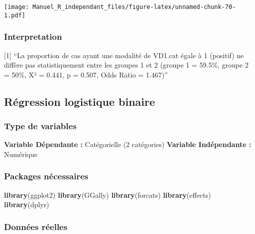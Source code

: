 \documentclass[
]{book}
\newenvironment{Shaded}{\begin{snugshade}}{\end{snugshade}}
\newcommand{\KeywordTok}[1]{\textcolor[rgb]{0.13,0.29,0.53}{\textbf{#1}}}
\newcommand{\NormalTok}[1]{#1}
\begin{document}
\texttt{[image: Manuel\_R\_independant\_files/figure-latex/unnamed-chunk-70-1.pdf]}

\hypertarget{interpretation-7}{%
\subsubsection{Interpretation}\label{interpretation-7}}

{[}1{]} ``La proportion de cas ayant une modalité de VD1.cat égale à 1 (positif) ne diffère pas statistiquement entre les groupes 1 et 2 (groupe 1 = 59.5\%, groupe 2 = 50\%, X² = 0.441, p = 0.507, Odds Ratio = 1.467)''

\hypertarget{ruxe9gression-logistique-binaire}{%
\subsection{Régression logistique binaire}\label{ruxe9gression-logistique-binaire}}

\hypertarget{type-de-variables-8}{%
\subsubsection{Type de variables}\label{type-de-variables-8}}

\textbf{Variable Dépendante :} Catégorielle (2 catégories)
\textbf{Variable Indépendante :} Numérique

\hypertarget{packages-nuxe9cessaires-8}{%
\subsubsection{Packages nécessaires}\label{packages-nuxe9cessaires-8}}

\begin{Shaded}
\begin{Highlighting}[]
\KeywordTok{library}\NormalTok{(ggplot2)}
\KeywordTok{library}\NormalTok{(GGally)}
\KeywordTok{library}\NormalTok{(forcats)}
\KeywordTok{library}\NormalTok{(effects)}
\KeywordTok{library}\NormalTok{(dplyr)}
\end{Highlighting}
\end{Shaded}

\hypertarget{donnuxe9es-ruxe9elles-8}{%
\subsubsection{Données réelles}\label{donnuxe9es-ruxe9elles-8}}
\end{document}
